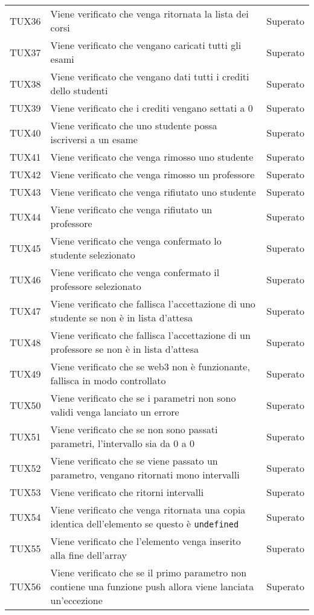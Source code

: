 \documentclass[PianoDiQualifica.tex]{subfiles}
\begin{document}
\begin{longtable}[H]{P{2cm}P{8.5cm}P{3cm}}
	TUX36 & Viene verificato che venga ritornata la lista dei corsi & Superato \\
	TUX37 & Viene verificato che vengano caricati tutti gli esami & Superato \\
	TUX38 & Viene verificato che vengano dati tutti i crediti dello studenti & Superato \\
	TUX39 & Viene verificato che i crediti vengano settati a 0 & Superato \\
	TUX40 & Viene verificato che uno studente possa iscriversi a un esame & Superato \\
	TUX41 & Viene verificato che venga rimosso uno studente & Superato \\
	TUX42 & Viene verificato che venga rimosso un professore & Superato \\
	TUX43 & Viene verificato che venga rifiutato uno studente & Superato \\
	TUX44 & Viene verificato che venga rifiutato un professore & Superato \\
	TUX45 & Viene verificato che venga confermato lo studente selezionato & Superato \\
	TUX46 & Viene verificato che venga confermato il professore selezionato & Superato \\
	TUX47 & Viene verificato che fallisca l'accettazione di uno studente se non è in lista d'attesa & Superato \\
	TUX48 & Viene verificato che fallisca l'accettazione di un professore se non è in lista d'attesa & Superato \\
	TUX49 & Viene verificato che se web3 non è funzionante, fallisca in modo controllato & Superato \\
	TUX50 & Viene verificato che se i parametri non sono validi venga lanciato un errore & Superato \\
	TUX51 & Viene verificato che se non sono passati parametri, l'intervallo sia da 0 a 0 & Superato \\
	TUX52 & Viene verificato che se viene passato un parametro, vengano ritornati mono intervalli  & Superato \\
	TUX53 & Viene verificato che ritorni intervalli & Superato \\
	TUX54 & Viene verificato che venga ritornata una copia identica dell'elemento se questo è \texttt{undefined} & Superato \\
	TUX55 & Viene verificato che l'elemento venga inserito alla fine dell'array & Superato \\
	TUX56 & Viene verificato che se il primo parametro non contiene una funzione push allora viene lanciata un'eccezione & Superato \\

\end{longtable}
\end{document}
